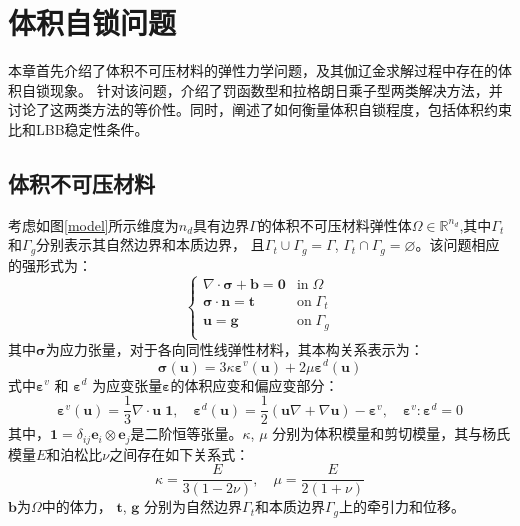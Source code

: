 \chapter{体积自锁问题}
本章首先介绍了体积不可压材料的弹性力学问题，及其伽辽金求解过程中存在的体积自锁现象。
针对该问题，介绍了罚函数型和拉格朗日乘子型两类解决方法，并讨论了这两类方法的等价性。同时，阐述了如何衡量体积自锁程度，包括体积约束比和LBB稳定性条件。

\section{体积不可压材料}               
考虑如图\ref{model}所示维度为$n_d$具有边界$\Gamma$的体积不可压材料弹性体$\Omega\in \mathbb R^{n_d}$,其中$\Gamma_t$和$\Gamma_g$分别表示其自然边界和本质边界，
且$\Gamma_t \cup \Gamma_g = \Gamma$, $\Gamma_t \cap \Gamma_g = \varnothing$。该问题相应的强形式为：
\begin{equation}\label{strong_penalty}
    \begin{cases}
        \nabla \cdot \boldsymbol \sigma + \boldsymbol b = \boldsymbol 0 & \mathrm{in} \; \Omega \\
        \boldsymbol \sigma \cdot \boldsymbol n = \boldsymbol t & \mathrm{on} \; \Gamma_t \\
        \boldsymbol u = \boldsymbol g & \mathrm{on} \; \Gamma_g \\
\end{cases}
\end{equation}
其中$\boldsymbol \sigma$为应力张量，对于各向同性线弹性材料，其本构关系表示为：
\begin{equation}\label{stress_penalty}
    \boldsymbol \sigma(\boldsymbol u) = 3\kappa \boldsymbol \varepsilon^v(\boldsymbol u) + 2\mu \boldsymbol \varepsilon^d(\boldsymbol u) 
\end{equation}
式中$\boldsymbol \varepsilon^v$ 和 $\boldsymbol \varepsilon^d$ 为应变张量$\boldsymbol \varepsilon$的体积应变和偏应变部分：
\begin{equation}
    \boldsymbol \varepsilon^v(\boldsymbol u) =\frac{1}{3} \nabla \cdot \boldsymbol u \; \boldsymbol 1, \quad
    \boldsymbol \varepsilon^d(\boldsymbol u) =\frac{1}{2}(\boldsymbol u \nabla + \nabla \boldsymbol u) - \boldsymbol \varepsilon^v, \quad
    \boldsymbol \varepsilon^v : \boldsymbol \varepsilon^d = 0
\end{equation}
其中，$\boldsymbol 1 = \delta_{ij} \boldsymbol e_i \otimes \boldsymbol e_j$是二阶恒等张量。$\kappa$, $\mu$ 分别为体积模量和剪切模量，其与杨氏模量$E$和泊松比$\nu$之间存在如下关系式：
\begin{equation}\label{modulus}
    \kappa = \frac{E}{3(1-2\nu)}, \quad \mu = \frac{E}{2(1+\nu)}
\end{equation}
$\boldsymbol b$为$\Omega$中的体力， $\boldsymbol t$, $\boldsymbol g$ 分别为自然边界$\Gamma_t$和本质边界$\Gamma_g$上的牵引力和位移。

